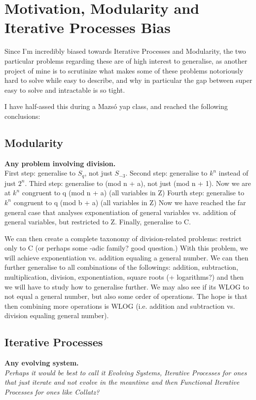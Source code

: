 \documentclass[a4paper]{article}
\theoremstyle{plain}
\theoremstyle{definition}
\theoremstyle{remark}
\begin{document}
\section{Motivation, Modularity and Iterative Processes Bias}
Since I'm incredibly biased towards Iterative Processes and Modularity, the two particular problems regarding these are of high interest to generalise, as another project of mine is to scrutinize what makes some of these problems notoriously hard to solve while easy to describe, and why in particular the gap between super easy to solve and intractable is so tight.

I have half-assed this during a Mazsó yap class, and reached the following conclusions:

\subsection{Modularity}
\textbf{Any problem involving division.}\\

First step: generalise to $S_q$, not just $S_{-3}$.
Second step: generalise to $k^n$ instead of just $2^n$. 
Third step: generalise to (mod n + a), not just (mod n + 1).
Now we are at $k^n$ congruent to q (mod n + a) (all variables in Z)
Fourth step: generalise to $k^n$ congruent to q (mod b + a) (all variables in Z)
Now we have reached the far general case that analyses exponentiation of general variables vs. addition of general variables, but restricted to Z.
Finally, generalise to C.

We can then create a complete taxonomy of division-related problems: restrict only to C (or perhaps some -adic family? good question.)
With this problem, we will achieve exponentiation vs. addition equaling a general number. We can then further generalise to all combinations of the followings: addition, subtraction, multiplication, division, exponentiation, square roots (+ logarithms?) and then we will have to study how to generalise further.
We may also see if its WLOG to not equal a general number, but also some order of operations. The hope is that then combining more operations is WLOG (i.e. addition and subtraction vs. division equaling general number).

\subsection{Iterative Processes}
\textbf{Any evolving system.}\\
\emph{Perhaps it would be best to call it Evolving Systems, Iterative Processes for ones that just iterate and not evolve in the meantime and then Functional Iterative Processes for ones like Collatz?}\\
\end{document}
